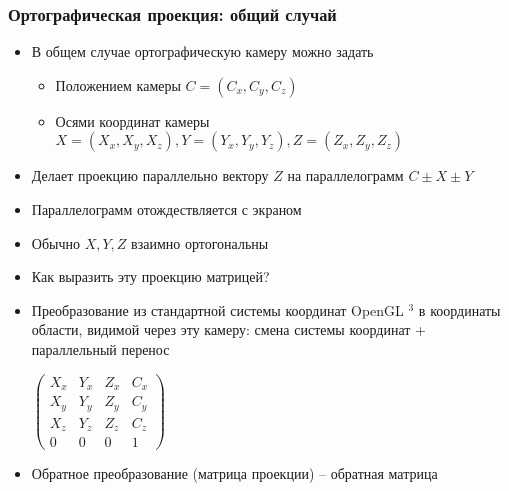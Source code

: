 \documentclass{beamer}
\begin{document}
\begin{frame}[fragile]
\frametitle{Ортографическая проекция: общий случай}
\begin{itemize}
\item В общем случае ортографическую камеру можно задать
\pause
\begin{itemize}
\item Положением камеры \begin{math}C = (C_x, C_y, C_z)\end{math}
\pause
\item Осями координат камеры \begin{math}X = (X_x, X_y, X_z), Y = (Y_x, Y_y, Y_z), Z = (Z_x, Z_y, Z_z)\end{math}
\end{itemize}
\pause
\item Делает проекцию параллельно вектору \begin{math}Z\end{math} на параллелограмм \begin{math}C \pm X \pm Y\end{math}
\item Параллелограмм отождествляется с экраном
\pause
\item Обычно \begin{math}X, Y, Z\end{math} взаимно ортогональны
\pause
\item Как выразить эту проекцию матрицей?
\pause
\item Преобразование из стандартной системы координат OpenGL \begin{math}[-1, 1]^3\end{math} в координаты области, видимой через эту камеру: смена системы координат + параллельный перенос
\begin{center}
\begin{math}
\begin{pmatrix}
X_x & Y_x & Z_x & C_x \\
X_y & Y_y & Z_y & C_y \\
X_z & Y_z & Z_z & C_z \\
0 & 0 & 0 & 1
\end{pmatrix}
\end{math}
\end{center}
\pause
\item Обратное преобразование (матрица проекции) -- обратная матрица
\end{itemize}
\end{frame}
\end{document}
